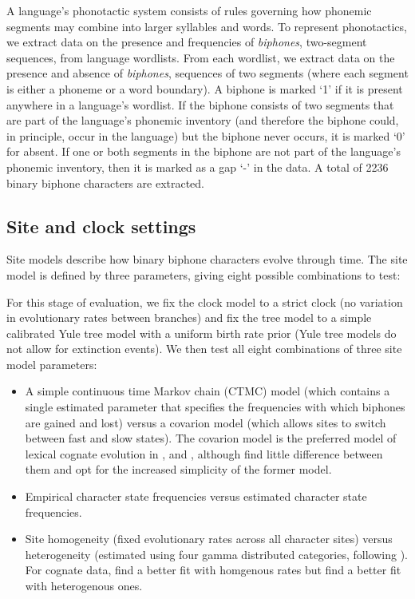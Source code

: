 \documentclass[]{article}
\providecommand{\tightlist}{%
  \setlength{\itemsep}{0pt}\setlength{\parskip}{0pt}}
\begin{document}
A language's phonotactic system consists of rules governing how phonemic segments may combine into larger syllables and words. To represent phonotactics, we extract data on the presence and frequencies of \emph{biphones}, two-segment sequences, from language wordlists. From each wordlist, we extract data on the presence and absence of \emph{biphones}, sequences of two segments (where each segment is either a phoneme or a word boundary). A biphone is marked `1' if it is present anywhere in a language's wordlist. If the biphone consists of two segments that are part of the language's phonemic inventory (and therefore the biphone could, in principle, occur in the language) but the biphone never occurs, it is marked `0' for absent. If one or both segments in the biphone are not part of the language's phonemic inventory, then it is marked as a gap `-' in the data. A total of 2236 binary biphone characters are extracted.

\hypertarget{site-and-clock-settings}{%
\subsection{Site and clock settings}\label{site-and-clock-settings}}

Site models describe how binary biphone characters evolve through time. The site model is defined by three parameters, giving eight possible combinations to test:

For this stage of evaluation, we fix the clock model to a strict clock (no variation in evolutionary rates between branches) and fix the tree model to a simple calibrated Yule tree model with a uniform birth rate prior (Yule tree models do not allow for extinction events). We then test all eight combinations of three site model parameters:

\begin{itemize}
\tightlist
\item
  A simple continuous time Markov chain (CTMC) model (which contains a single estimated parameter that specifies the frequencies with which biphones are gained and lost) versus a covarion model (which allows sites to switch between fast and slow states). The covarion model is the preferred model of lexical cognate evolution in \textcite{bouckaert_corrections_2012}, \textcite{bouckaert_origin_2018} and \textcite{kolipakam_bayesian_2018}, although \textcite[p.~219]{chang_ancestry-constrained_2015} find little difference between them and opt for the increased simplicity of the former model.
\item
  Empirical character state frequencies versus estimated character state frequencies.
\item
  Site homogeneity (fixed evolutionary rates across all character sites) versus heterogeneity (estimated using four gamma distributed categories, following \textcite{kolipakam_bayesian_2018}). For cognate data, \textcite{bouckaert_origin_2018} find a better fit with homgenous rates but \textcite{kolipakam_bayesian_2018} find a better fit with heterogenous ones.
\end{itemize}
\end{document}
